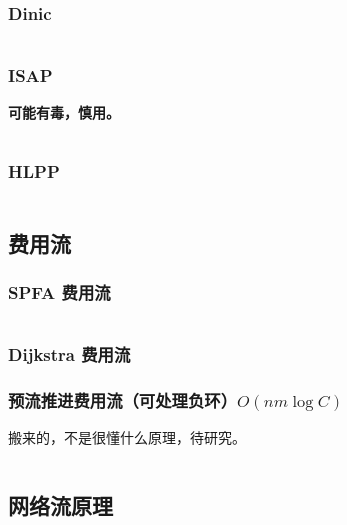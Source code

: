 \documentclass[a4paper, twoside]{article}
\begin{document}
\begin{multicols}{2}
				\subsubsection{Dinic}
					\inputminted{cpp}{../src/graph/Dinic.cpp}

				\subsubsection{ISAP}
					\textbf{可能有毒，慎用。}
					\inputminted{cpp}{../src/graph/ISAP.cpp}

				\subsubsection[最高标号预流推进 HLPP]{HLPP}
					\inputminted{cpp}{../src/graph/HLPP.cpp}
			
			\subsection{费用流}
				\subsubsection{SPFA 费用流}
					\inputminted{cpp}{../src/graph/SPFA费用流.cpp}

				\subsubsection{Dijkstra 费用流}
					
				
				\subsubsection{预流推进费用流（可处理负环）$O(nm \log C)$}
					搬来的，不是很懂什么原理，待研究。

					\inputminted{cpp}{../src/graph/预流推进费用流.cpp}



			

			\subsection{网络流原理}
				
			

\end{multicols}
\end{document}
